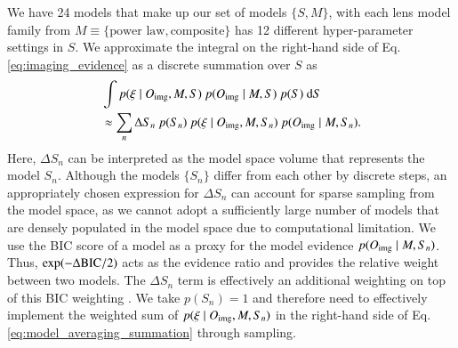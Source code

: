 \documentclass[longauth]{aa}
\newcommand{\rmd}{{\rm d}}
\newcommand{\ajsiv}[1]{{{#1}}}
\begin{document}
We have 24 models that make up our set of models $\{ S, M \}$, with each lens model family from $M \equiv \{\textrm{power law}, \textrm{composite}\}$ has  12 different hyper-parameter settings in $S$. We approximate the integral on the right-hand side of Eq. \ref{eq:imaging_evidence} as a discrete summation over $S$ as
%
\begin{equation} \label{eq:model_averaging_summation}
\begin{split}
        &\int p(\xi \mid O_{\rm img}, M, S) \ p(O_{\rm img} \mid M, S) \ p(S) \ \rmd S \\ 
        &\approx \sum_{n} \Delta S_n\ p(S_n) \ p(\xi \mid O_{\rm img}, M, S_n) \ p(O_{\rm img} \mid M, S_n).
\end{split}
\end{equation}
%
Here, $\Delta S_n$ can be interpreted as the model space volume that represents the model $S_n$. Although the models $\{S_n\}$ differ from each other by discrete steps, an appropriately chosen expression for $\Delta S_{n}$ can account for sparse sampling from the model space, as we cannot adopt a sufficiently large number of models that are densely populated in the model space due to computational limitation. We use \ajsiv{the} BIC score  of a model as a proxy for the model evidence $p(O_{\rm img} \mid M, S_n)$. Thus, $\exp(- \Delta {\rm BIC }/2)$ acts as the evidence ratio and provides the relative weight between two models. The $\Delta S_n$ term is effectively an additional weighting on top of this BIC weighting \citep{Birrer19b, Shajib20}. We take $p(S_n) = 1$ and therefore need to effectively implement the weighted sum of $p(\xi \mid O_{\rm img}, M, S_n)$ in the right-hand side of Eq. \ref{eq:model_averaging_summation} through sampling.
\end{document}
